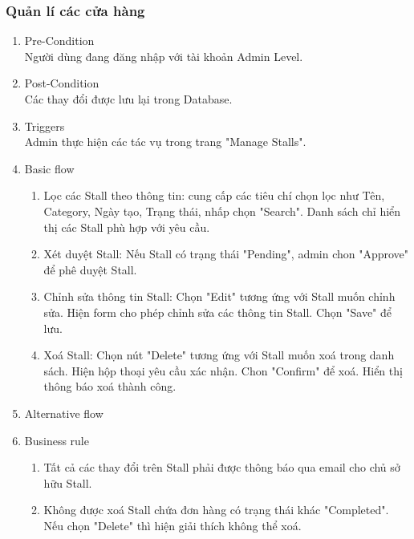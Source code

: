 \subsubsection{Quản lí các cửa hàng}
\begin{enumerate}
	\item Pre-Condition\\
	Người dùng đang đăng nhập với tài khoản Admin Level.
	\item Post-Condition\\
	Các thay đổi được lưu lại trong Database.
	\item Triggers\\
	Admin thực hiện các tác vụ trong trang "Manage Stalls".
	\item Basic flow
	\begin{enumerate}
		\item Lọc các Stall theo thông tin: cung cấp các tiêu chí chọn lọc như Tên, Category, Ngày tạo, Trạng thái, nhấp chọn "Search". Danh sách chỉ hiển thị các Stall phù hợp với yêu cầu. 
		\item Xét duyệt Stall: Nếu Stall có trạng thái "Pending", admin chon "Approve" để phê duyệt Stall. 
		\item Chỉnh sửa thông tin Stall: Chọn "Edit" tương ứng với Stall muốn chỉnh sửa. Hiện form cho phép chỉnh sửa các thông tin Stall. Chọn "Save" để lưu.
		\item Xoá Stall: Chọn nút "Delete" tương ứng với Stall muốn xoá trong danh sách. Hiện hộp thoại yêu cầu xác nhận. Chon "Confirm" để xoá. Hiển thị thông báo xoá thành công.
	\end{enumerate}
	\item Alternative flow
	\item Business rule
	\begin{enumerate}
		\item Tất cả các thay đổi trên Stall phải được thông báo qua email cho chủ sở hữu Stall.
		\item Không được xoá Stall chứa đơn hàng có trạng thái khác "Completed". Nếu chọn "Delete" thì hiện giải thích không thể xoá.
	\end{enumerate}
\end{enumerate}

